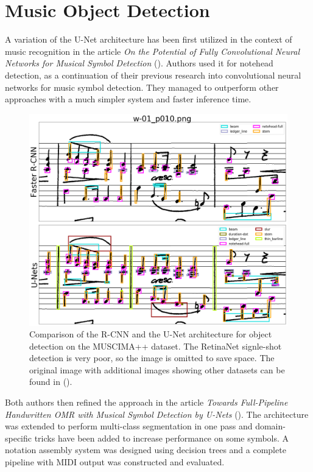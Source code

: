 \section{Music Object Detection}

A variation of the U-Net architecture has been first utilized in the context of music recognition in the article \emph{On the Potential of Fully Convolutional Neural Networks for Musical Symbol Detection} (\cite{DorferEtAl}). Authors used it for notehead detection, as a continuation of their previous research into convolutional neural networks for music symbol detection. They managed to outperform other approaches with a much simpler system and faster inference time.

\begin{figure}[ht]
    \centering
    \includegraphics[width=145mm]{../img/muscima-detection-comparison.png}
    \caption{Comparison of the R-CNN and the U-Net architecture for object detection on the MUSCIMA++ dataset. The RetinaNet signle-shot detection is very poor, so the image is omitted to save space. The original image with additional images showing other datasets can be found in (\cite{PachaBaseline}).}
    \label{fig:MuscimaDetectionComparison}
\end{figure}

Both authors then refined the approach in the article \emph{Towards Full-Pipeline Handwritten OMR with Musical Symbol Detection by U-Nets} (\cite{HajicEtAl}). The architecture was extended to perform multi-class segmentation in one pass and domain-specific tricks have been added to increase performance on some symbols. A notation assembly system was designed using decision trees and a complete pipeline with MIDI output was constructed and evaluated.

